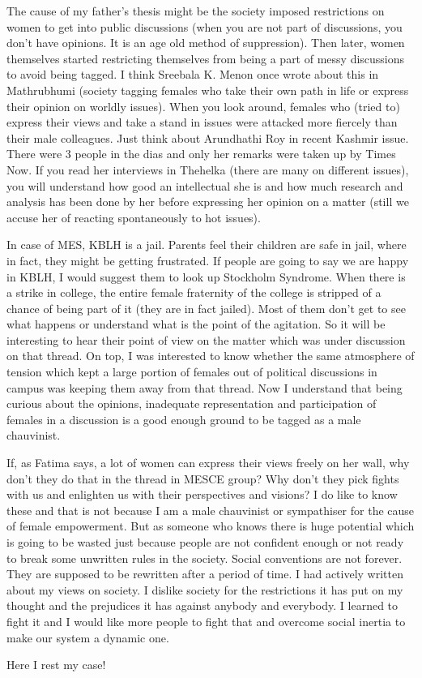 The cause of my father’s thesis might be the society imposed restrictions on women to get into public discussions (when you are not part of discussions, you don’t have opinions. It is an age old method of suppression). Then later, women themselves started restricting themselves from being a part of messy discussions to avoid being tagged. I think Sreebala K. Menon once wrote about this in Mathrubhumi (society tagging females who take their own path in life or express their opinion on worldly issues). When you look around, females who (tried to) express their views and take a stand in issues were attacked more fiercely than their male colleagues. Just think about Arundhathi Roy in recent Kashmir issue. There were 3 people in the dias and only her remarks were taken up by Times Now. If you read her interviews in Thehelka (there are many on different issues), you will understand how good an intellectual she is and how much research and analysis has been done by her before expressing her opinion on a matter (still we accuse her of reacting spontaneously to hot issues).

In case of MES, KBLH is a jail. Parents feel their children are safe in jail, where in fact, they might be getting frustrated. If people are going to say we are happy in KBLH, I would suggest them to look up Stockholm Syndrome. When there is a strike in college, the entire female fraternity of the college is stripped of a chance of being part of it (they are in fact jailed). Most of them don't get to see what happens or understand what is the point of the agitation. So it will be interesting to hear their point of view on the matter which was under discussion on that thread. On top, I was interested to know whether the same atmosphere of tension which kept a large portion of females out of political discussions in campus was keeping them away from that thread. Now I understand that being curious about the opinions, inadequate representation and participation of females in a discussion is a good enough ground to be tagged as a male chauvinist.

If, as Fatima says, a lot of women can express their views freely on her wall, why don't they do that in the thread in MESCE group? Why don't they pick fights with us and enlighten us with their perspectives and visions? I do like to know these and that is not because I am a male chauvinist or sympathiser for the cause of female empowerment. But as someone who knows there is huge potential which is going to be wasted just because people are not confident enough or not ready to break some unwritten rules in the society. Social conventions are not forever. They are supposed to be rewritten after a period of time. I had actively written about my views on society. I dislike society for the restrictions it has put on my thought and the prejudices it has against anybody and everybody. I learned to fight it and I would like more people to fight that and overcome social inertia to make our system a dynamic one.

Here I rest my case!


\newpage
